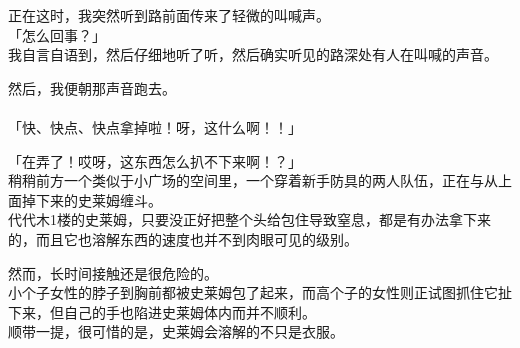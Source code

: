 正在这时，我突然听到路前面传来了轻微的叫喊声。\\

「怎么回事？」\\

我自言自语到，然后仔细地听了听，然后确实听见的路深处有人在叫喊的声音。

然后，我便朝那声音跑去。\\

\sqsplit\\

「快、快点、快点拿掉啦！呀，这什么啊！！」

「在弄了！哎呀，这东西怎么扒不下来啊！？」\\

稍稍前方一个类似于小广场的空间里，一个穿着新手防具的两人队伍，正在与从上面掉下来的史莱姆缠斗。\\

代代木1楼的史莱姆，只要没正好把整个头给包住导致窒息，都是有办法拿下来的，而且它也溶解东西的速度也并不到肉眼可见的级别。

然而，长时间接触还是很危险的。\\

小个子女性的脖子到胸前都被史莱姆包了起来，而高个子的女性则正试图抓住它扯下来，但自己的手也陷进史莱姆体内而并不顺利。\\

顺带一提，很可惜的是，史莱姆会溶解的不只是衣服。\\

